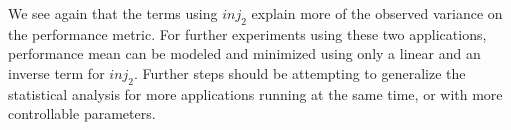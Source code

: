 \documentclass[a4paper]{article}
\begin{document}
We see again that  the terms using \(inj_2\) explain more  of the observed variance
on the performance metric. For further experiments using these two applications,
performance mean can be modeled and minimized using only a linear and an inverse
term  for  \(inj_2\).  Further  steps   should  be  attempting  to  generalize  the
statistical analysis  for more applications  running at  the same time,  or with
more controllable parameters.
\end{document}
